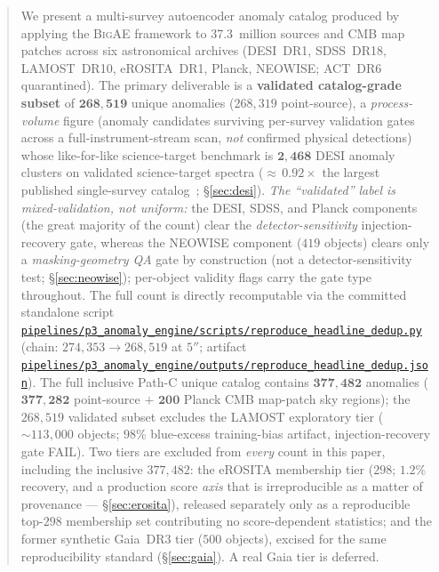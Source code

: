 \documentclass[aps,prd,twocolumn,superscriptaddress,showpacs,preprintnumbers,nofootinbib,longbibliography,floatfix]{revtex4-2}
\newcommand{\repoBase}{https://github.com/Hubify-Projects/bigbounce/blob/main}
\newcommand{\artifact}[1]{\href{\repoBase/#1}{\nolinkurl{#1}}}
\newcommand{\BigAE}{\textsc{BigAE}}
\begin{document}
\begin{abstract}
We present a multi-survey autoencoder anomaly catalog produced by applying the \BigAE{} framework to 37.3~million sources and CMB map patches across six astronomical archives (DESI~DR1, SDSS~DR18, LAMOST~DR10, eROSITA~DR1, Planck, NEOWISE; ACT~DR6 quarantined). The primary deliverable is a \textbf{validated catalog-grade subset} of $\mathbf{268{,}519}$ unique anomalies ($268{,}319$ point-source), a \emph{process-volume} figure (anomaly candidates surviving per-survey validation gates across a full-instrument-stream scan, \emph{not} confirmed physical detections) whose like-for-like science-target benchmark is $\mathbf{2{,}468}$ DESI anomaly clusters on validated science-target spectra (${\approx}\,0.92\times$ the largest published single-survey catalog~\cite{Liang2023}; \S\ref{sec:desi}). \emph{The ``validated'' label is mixed-validation, not uniform:} the DESI, SDSS, and Planck components (the great majority of the count) clear the \emph{detector-sensitivity} injection-recovery gate, whereas the NEOWISE component ($419$ objects) clears only a \emph{masking-geometry QA} gate by construction (not a detector-sensitivity test; \S\ref{sec:neowise}); per-object validity flags carry the gate type throughout. The full count is directly recomputable via the committed standalone script \artifact{pipelines/p3\_anomaly\_engine/scripts/reproduce\_headline\_dedup.py} (chain: $274{,}353\!\to\!268{,}519$ at $5''$; artifact \artifact{pipelines/p3\_anomaly\_engine/outputs/reproduce\_headline\_dedup.json}). The full inclusive Path-C unique catalog contains $\mathbf{377{,}482}$ anomalies ($\mathbf{377{,}282}$ point-source $+$ $\mathbf{200}$ Planck CMB map-patch sky regions); the $268{,}519$ validated subset excludes the LAMOST exploratory tier ($\sim\!113{,}000$ objects; 98\% blue-excess training-bias artifact, injection-recovery gate FAIL). Two tiers are excluded from \emph{every} count in this paper, including the inclusive $377{,}482$: the eROSITA membership tier ($298$; $1.2\%$ recovery, and a production score \emph{axis} that is irreproducible as a matter of provenance --- \S\ref{sec:erosita}), released separately only as a reproducible top-$298$ membership set contributing no score-dependent statistics; and the former synthetic Gaia~DR3 tier ($500$ objects), excised for the same reproducibility standard (\S\ref{sec:gaia}). A real Gaia tier is deferred.


\end{abstract}
\end{document}
